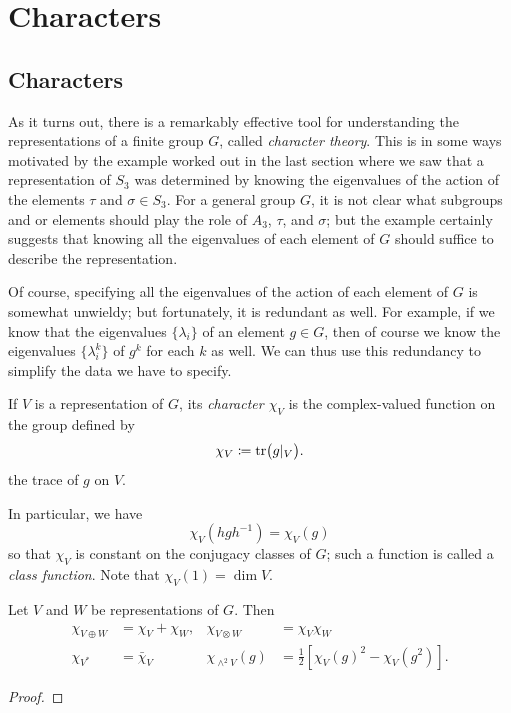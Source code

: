 \section{Characters}
\subsection{Characters}
As it turns out, there is a remarkably effective tool for understanding the
representations of a finite group $G$, called \emph{character theory}. This
is in some ways motivated by the example worked out in the last section
where we saw that a representation of $S_3$ was determined by knowing the
eigenvalues of the action of the elements $\tau$ and $\sigma\in S_3$. For a
general group $G$, it is not clear what subgroups and or elements should
play the role of $A_3$, $\tau$, and $\sigma$; but the example certainly
suggests that knowing all the eigenvalues of each element of $G$ should
suffice to describe the representation.

Of course, specifying all the eigenvalues of the action of each element of
$G$ is somewhat unwieldy; but fortunately, it is redundant as well. For
example, if we know that the eigenvalues $\{\lambda_i\}$ of an element
$g\in G$, then of course we know the eigenvalues $\{\lambda_i^k\}$ of $g^k$
for each $k$ as well. We can thus use this redundancy to simplify the data
we have to specify.

\begin{definition}
If $V$ is a representation of $G$, its \emph{character $\chi_V$} is the
complex-valued function on the group defined by
\[
\chi_V\coloneqq\operatorname{tr}\bigr(g|_V\bigl).
\]
the trace of $g$ on $V$.
\end{definition}

In particular, we have
\[
\chi_V(hgh^{-1})=\chi_V(g)
\]
so that $\chi_V$ is constant on the conjugacy classes of $G$; such a
function is called a \emph{class function}. Note that $\chi_V(1)=\dim V$.

\begin{proposition}
Let $V$ and $W$ be representations of $G$. Then
\[
  \begin{aligned}
    \chi_{V\oplus W}&=\chi_V+\chi_W,&\chi_{V\otimes W}&=\chi_V\chi_W\\
    \chi_{V^*}&=\bar\chi_V&\chi_{\wedge^2
      V}(g)&=\tfrac{1}{2}\left[\chi_V(g)^2-\chi_V(g^2)\right].
  \end{aligned}
\]
\end{proposition}
\begin{proof}
\end{proof}




